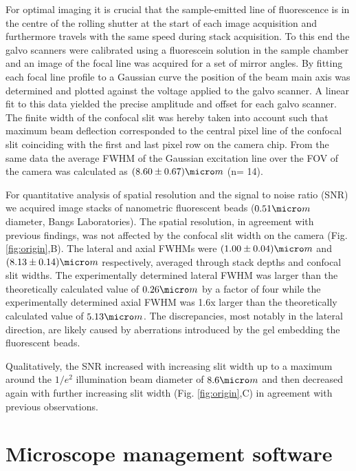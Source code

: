 \documentclass[12pt]{spieman}  %
\begin{document}
For optimal imaging it is crucial that the sample-emitted line of fluorescence is in the centre of the rolling shutter at the start of each image acquisition and furthermore travels with the same speed during stack acquisition. To this end the galvo scanners were calibrated using a fluorescein solution in the sample chamber and an image of the focal line was acquired for a set of mirror angles. By fitting each focal line profile to a Gaussian curve the position of the beam main axis was determined and plotted against the voltage applied to the galvo scanner. A linear fit to this data yielded the precise amplitude and offset for each galvo scanner. The finite width of the confocal slit was hereby taken into account such that maximum beam deflection corresponded to the central pixel line of the confocal slit coinciding with the first and last pixel row on the camera chip. From the same data the average FWHM of the Gaussian excitation line over the FOV of the camera was calculated as $(8.60\pm0.67)\micro m$ (n= 14).

For quantitative analysis of spatial resolution and the signal to noise ratio (SNR) we acquired image stacks of nanometric fluorescent beads ($0.51 \micro m$ diameter, Bangs Laboratories). The spatial resolution, in agreement with previous findings\cite{Wilson1987,Cox2004}, was not affected by the confocal slit width on the camera (Fig. \ref{fig:origin},B). The lateral and axial FWHMs were $(1.00\pm0.04) \micro m$ and $(8.13\pm0.14) \micro m$ respectively, averaged through stack depths and confocal slit widths. The experimentally determined lateral FWHM was larger than the theoretically calculated value of $0.26 \micro m$ by a factor of four while the experimentally determined axial FWHM was 1.6x larger than the theoretically calculated value of $5.13 \micro m$. The discrepancies, most notably in the lateral direction, are likely caused by aberrations introduced by the gel embedding the fluorescent beads.

Qualitatively, the SNR increased with increasing slit width up to a maximum around the $1/e^2$ illumination beam diameter of $8.6 \micro m$ and then decreased again with further increasing slit width (Fig. \ref{fig:origin},C) in agreement with previous observations\cite{Baumgart2012}.   



\section{Microscope management software}
\end{document}
